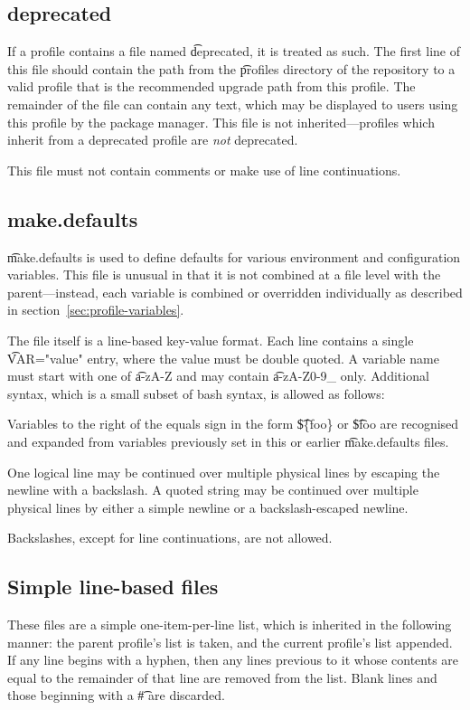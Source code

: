 \subsection{deprecated}
If a profile contains a file named \t{deprecated}, it is treated as such. The first line of this
file should contain the path from the \t{profiles} directory of the repository to a valid profile
that is the recommended upgrade path from this profile. The remainder of the file can contain any
text, which may be displayed to users using this profile by the package manager. This file is not
inherited---profiles which inherit from a deprecated profile are \emph{not} deprecated.

This file must not contain comments or make use of line continuations.

\subsection{make.defaults}
\t{make.defaults} is used to define defaults for various environment and configuration variables.
This file is unusual in that it is not combined at a file level with the parent---instead, each
variable is combined or overridden individually as described in section~\ref{sec:profile-variables}.

The file itself is a line-based key-value format. Each line contains a single \t{VAR="value"}
entry, where the value must be double quoted. A variable name must start with one of \t{a-zA-Z}
and may contain \t{a-zA-Z0-9_} only. Additional syntax, which is a small subset of
bash syntax, is allowed as follows:

\begin{compactitem}
\item Variables to the right of the equals sign in the form \t{\$\{foo\}} or \t{\$foo} are
    recognised and expanded from variables previously set in this or earlier \t{make.defaults}
    files.
\item One logical line may be continued over multiple physical lines by escaping the newline with
    a backslash. A quoted string may be continued over multiple physical lines by either a simple
    newline or a backslash-escaped newline.
\item Backslashes, except for line continuations, are not allowed.
\end{compactitem}

\subsection{Simple line-based files}
\label{sec:line-stacking}
These files are a simple one-item-per-line list, which is inherited in the following manner: the
parent profile's list is taken, and the current profile's list appended. If any line begins with a
hyphen, then any lines previous to it whose contents are equal to the remainder of that line are
removed from the list. Blank lines and those beginning with a \t{\#} are discarded.

